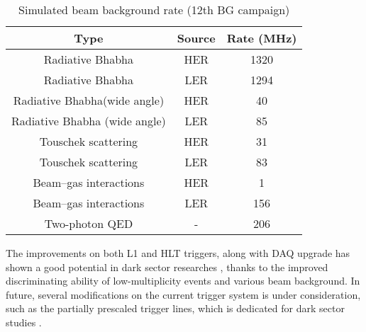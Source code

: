 \begin{table}[htbp]
	\centering
	\large
	\caption{Simulated beam background rate (12th BG campaign)\cite{b2book}}
	\label{tab:BG}
	\begin{tabular}{c c c}
		\toprule
		Type & Source & Rate (MHz)\\
		\hline
		Radiative Bhabha & HER &  1320\\
		Radiative Bhabha & LER &  1294\\
		Radiative Bhabha(wide angle) & HER &  40\\
		Radiative Bhabha (wide angle) & LER &  85\\
		Touschek scattering & HER &  31\\
		Touschek scattering & LER &  83\\
		Beam–gas interactions & HER &  1\\
		Beam–gas interactions & LER &  156\\
		Two-photon QED & - & 206\\
		\bottomrule
	\end{tabular}
\end{table}

The improvements on both L1 and HLT triggers, along with DAQ upgrade has shown a good potential in dark sector researches \cite{de2018first}\cite{macqueen2020dark}, thanks to the improved discriminating ability of low-multiplicity events and various beam background. In future, several modifications on the current trigger system is under consideration, such as the partially prescaled trigger lines, which is dedicated for dark sector studies \cite{b2book}. 


\begin{comment}
Based on the reasons discussed above, Belle II trigger has been designed to have 2 separated levels of triggers. Low level trigger, also called as L1 trigger, is hardware-based trigger. and high level trigger (HLT) is the software based trigger.
The L1 trigger rate can go up to 30kHz that is also the up-limit of DAQ read-in rate. The latency of L1 is control to be 5 $\mu$s, improved from Belle trigger.
And yet 30kHz is still to high for writing out the data to tape, so the HLT must be implemented to reduce the trigger rate to about 10kHz and it has to be able to select ROI on the PXD to reduce the data flux limited by bandwidth of read-out cables. To do that, HLT utilize  the full offline reconstruction algorithms to allow the access of full-granularity
event reconstruction using all detectors except for the PXD. 

\end{comment}

